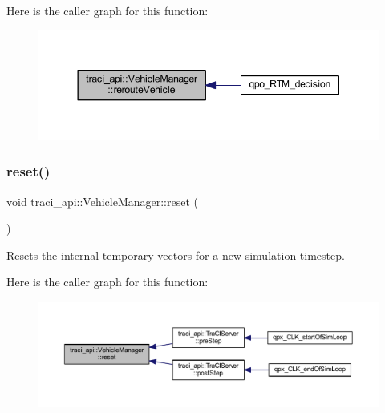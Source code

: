 Here is the caller graph for this function\+:
\nopagebreak
\begin{figure}[H]
\begin{center}
\leavevmode
\includegraphics[width=344pt]{classtraci__api_1_1_vehicle_manager_a47a471305d82ae97f65ac2c90f384baa_icgraph}
\end{center}
\end{figure}
\mbox{\label{classtraci__api_1_1_vehicle_manager_abbf990fe432a286e4d3889ff3b3491df}} 
\subsubsection{\texorpdfstring{reset()}{reset()}}
{\footnotesize\ttfamily void traci\+\_\+api\+::\+Vehicle\+Manager\+::reset (\begin{DoxyParamCaption}{ }\end{DoxyParamCaption})}



Resets the internal temporary vectors for a new simulation timestep. 

Here is the caller graph for this function\+:
\nopagebreak
\begin{figure}[H]
\begin{center}
\leavevmode
\includegraphics[width=350pt]{classtraci__api_1_1_vehicle_manager_abbf990fe432a286e4d3889ff3b3491df_icgraph}
\end{center}
\end{figure}
\mbox{\label{classtraci__api_1_1_vehicle_manager_a02bcdc3429c0b027345148d9f5824554}} 
